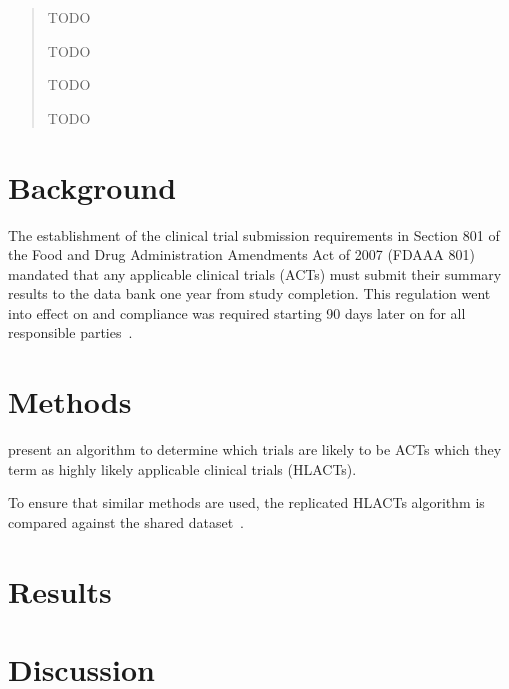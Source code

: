 \documentclass[10pt]{article}
\begin{document}
\maketitle

\begin{abstract}
\noindent
\begin{abstractdesc}
\item[Background] TODO
%
\item[Methods] TODO
%
\item[Results] TODO
%
\item[Conclusions] TODO
\end{abstractdesc}
\end{abstract}

\tableofcontents


\section{Background}

The establishment of the clinical trial submission requirements in
Section 801 of the Food and Drug Administration Amendments Act of 2007
(FDAAA 801)~\cite{publiclaw_fdaa_2007_s801}
mandated that any applicable clinical trials (ACTs) must
submit their summary results to the \ctgov{} data bank one year from study completion.
This regulation went into effect on 
and compliance was required starting 90 days later on
 for all responsible
parties~\cite{ctgov_fdaaa801_final_rule_2024,zarin_trial_2016}.

\section{Methods}

\textcite{anderson_compliance_2015} present an algorithm to
determine which trials are likely to be ACTs which they term as
highly likely applicable clinical trials (HLACTs).

To ensure that similar methods are used, the replicated HLACTs
algorithm is compared against the \textcite{anderson_compliance_2015}
shared dataset~\cite{anderson_data_20130927}.

\section{Results}

\section{Discussion}

\printbibliography
\end{document}
